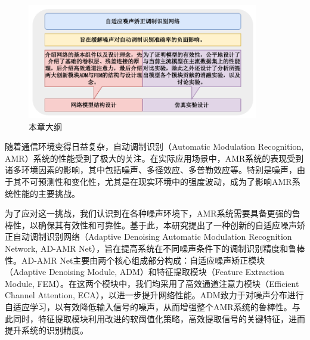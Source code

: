 

\begin{figure}
    \centering
    \includegraphics[width=0.9\textwidth]{Image/chap3_map.pdf}
    \caption{本章大纲}
    \label{fig:ad-amr-overview}
\end{figure}

随着通信环境变得日益复杂，自动调制识别（Automatic Modulation Recognition, AMR）系统的性能受到了极大的关注。在实际应用场景中，AMR系统的表现受到诸多环境因素的影响，其中包括噪声、多径效应、多普勒效应等。特别是噪声，由于其不可预测性和变化性，尤其是在现实环境中的强度波动，成为了影响AMR系统性能的主要挑战。

为了应对这一挑战，我们认识到在各种噪声环境下，AMR系统需要具备更强的鲁棒性，以确保其有效性和可靠性。基于此，本研究提出了一种创新的自适应噪声矫正自动调制识别网络（Adaptive Denoising Automatic Modulation Recognition Network, AD-AMR Net），旨在提高系统在不同噪声条件下的调制识别精度和鲁棒性。AD-AMR Net主要由两个核心组成部分构成：自适应噪声矫正模块（Adaptive Denoising Module, ADM）和特征提取模块（Feature Extraction Module, FEM）。在这两个模块中，我们均采用了高效通道注意力模块（Efficient Channel Attention, ECA），以进一步提升网络性能。ADM致力于对噪声分布进行自适应学习，以有效降低输入信号的噪声，从而增强整个AMR系统的鲁棒性。与此同时，特征提取模块利用改进的软阈值化策略，高效提取信号的关键特征，进而提升系统的识别精度。

